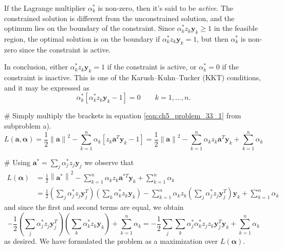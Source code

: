 \documentclass[12pt, a4paper]{article}
\newcommand{\vect}[1]{\bm{#1}}
\newcommand{\norm}[1]{\left\lVert#1\right\rVert}
\begin{document}
{\begin{easylist}[enumerate]
If the Lagrange  multiplier $\alpha_k^*$ is non-zero, then it's said to be \emph{active}.
The constrained solution is different from the unconstrained solution, and the optimum lies on the boundary of the constraint.
Since $\alpha_k^* z_k \vect{y}_k \geq 1$ in the feasible region, the optimal solution is on the boundary if $\alpha_k^* z_k \vect{y}_k = 1$, but then  $\alpha_k^*$ is non-zero since the constraint is active.

In conclusion, either $\alpha_k^* z_k \vect{y}_k = 1$ if the constraint is active, or $\alpha_k^* = 0$ if the constraint is inactive.
This is one of the Karush–Kuhn–Tucker (KKT) conditions, and it may be expressed as
\begin{equation*}
	\alpha_k^* \left[ \alpha_k^* z_k \vect{y}_k - 1 \right] = 0 \qquad k = 1 , \dots, n.
\end{equation*}

# Simply multiply the brackets in equation \eqref{eqn:ch5_problem_33_1} from subproblem a).
\begin{equation*}
L(\vect{a}, \vect{\alpha}) = \frac{1}{2} \norm{\vect{a}}^2 -
\sum_{k=1}^{n} \alpha_k \left[ z_k \vect{a}^T \vect{y}_k - 1 \right]
=
\frac{1}{2} \norm{\vect{a}}^2 -
\sum_{k=1}^{n} \alpha_k  z_k \vect{a}^T \vect{y}_k 
+
\sum_{k=1}^{n} \alpha_k 
\end{equation*}

# Using $\vect{a}^* = \sum_j \alpha_j^* z_j \vect{y}_j$ we observe that
\begin{align*}
	L(\vect{\alpha}) &= 
	\frac{1}{2} \norm{\vect{a}^*}^2 -
	\sum_{k=1}^{n} \alpha_k  z_k \vect{a}^{*T} \vect{y}_k 
	+
	\sum_{k=1}^{n} \alpha_k \\
	&= 
	\frac{1}{2} 
	\left(\sum_j \alpha_j^* z_j \vect{y}^T_j\right)
	\left(\sum_k \alpha_k^* z_k \vect{y}_k\right)
	 -
	\sum_{k=1}^{n} \alpha_k  z_k 
	\left(\sum_j \alpha_j^* z_j \vect{y}^T _j\right)
	\vect{y}_k 
	+
	\sum_{k=1}^{n} \alpha_k 
\end{align*}
and since the first and second terms are equal, we obtain
\begin{equation*}
-
\frac{1}{2} 
\left(\sum_j \alpha_j^* z_j \vect{y}^T_j\right)
\left(\sum_k \alpha_k^* z_k \vect{y}_k\right)
+
\sum_{k=1}^{n} \alpha_k 
= 
-
\frac{1}{2} 
\sum_j \sum_k \alpha_j^* \alpha_k^* z_j z_k \vect{y}_j^T \vect{y}_k
+
\sum_{k=1}^{n} \alpha_k 
\end{equation*}
as desired.
We have formulated the problem as a maximization over $L(\vect{\alpha})$.
\end{easylist}




























}
\end{document}
